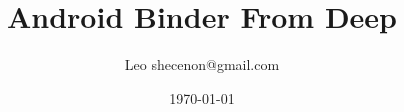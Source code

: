 \documentclass[a4paper,11pt]{article}
\title{Android Binder From Deep}
\author{Leo shecenon@gmail.com}
\date{\today}
\begin{document}
\maketitle
\renewcommand{\refname}{参考文献}
\renewcommand\contentsname{目录}
\renewcommand\listfigurename{插图目录}
\renewcommand\listtablename{表格目录}
\renewcommand\indexname{索引}
\renewcommand\appendixname{附录}
\renewcommand\figurename{图}
\renewcommand\tablename{表}
\renewcommand{\lstlistlistingname}{代码列表集}
\renewcommand{\lstlistingname}{代码}

\def\equationautorefname{公式}%
\def\figureautorefname{图}%
\def\subfigureautorefname{子图}%
\def\sectionautorefname{节}%
\def\subsectionautorefname{子节}%
\def\subsubsectionautorefname{小节}%
\def\Itemautorefname{项}%
\def\tableautorefname{表格}%
\def\footnoteautorefname{脚注}
\def\appendixautorefname{附录}


\setlength{\columnsep}{.8cm}
\setlength{\parskip}{1ex}
\tableofcontents
\makeatletter
\newcommand{\figcaption}{\def\@captype{figure}\caption}
\newcommand{\tabcaption}{\def\@captype{table}\caption}
\makeatother

\def\call#1{\\* {\indent #1 \\*\noindent}}
\newcommand{\various}[1]{{\color{cyan}\textit{#1}}}
\def\binder{{\color{red}binder }}

\def\lbd{本地Binder}
\def\rbd{远程Binder}
\def\binderobj{\lbd}%
\def\binderref{\rbd}%
\def\service{}%
\def\client{}%
\def\impl{}%
\def\proxy{}%


\setlength{\leftmargin}{1.2em}     %
\setlength{\parsep}{0ex}         %
\setlength{\topsep}{1ex}         %
\setlength{\itemsep}{0.5ex}        %
\setlength{\labelsep}{0.3em}     %
\setlength{\itemindent}{1.1em}    %
\setlength{\listparindent}{0em} %
\end{document}
